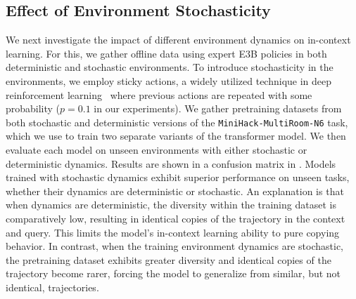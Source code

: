 \documentclass[]{fairmeta}
\begin{document}
\subsection{Effect of Environment Stochasticity}
\label{sec:env_stochasticity}
We next investigate the impact of different environment dynamics on in-context learning. For this, we gather offline data using expert E3B policies in both deterministic and stochastic environments. To introduce stochasticity in the environments, we employ sticky actions, a widely utilized technique in deep reinforcement learning~\citep{machado2018revisiting} where previous actions are repeated with some probability ($p=0.1$ in our experiments).
We gather pretraining datasets from both stochastic and deterministic versions of the \texttt{MiniHack-MultiRoom-N6} task, which we use to train two separate variants of the transformer model. We then evaluate each model on unseen environments with either stochastic or deterministic dynamics. Results are shown in a confusion matrix in .
Models trained with stochastic dynamics exhibit superior performance on unseen tasks, whether their dynamics are deterministic or stochastic.
An explanation is that when dynamics are deterministic, the diversity within the training dataset is comparatively low, resulting in identical copies of the trajectory in the context and query. This limits the model's in-context learning ability to pure copying behavior. In contrast, when the training environment dynamics are stochastic, the pretraining dataset exhibits greater diversity and identical copies of the trajectory become rarer, forcing the model to generalize from similar, but not identical, trajectories.
\end{document}
